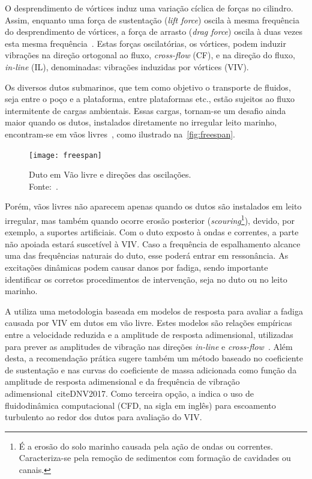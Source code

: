 O desprendimento de vórtices induz uma variação cíclica de forças no cilindro.
Assim, enquanto uma força de sustentação (\textit{lift force}) oscila à mesma frequência do desprendimento de vórtices, a força de arrasto (\textit{drag force}) oscila à duas vezes esta mesma frequência~\cite{Sumer1995}.
Estas forças oscilatórias, os vórtices, podem induzir vibrações na direção ortogonal ao fluxo, \textit{cross-flow} (CF), e na direção do fluxo, \textit{in-line} (IL), denominadas: vibrações induzidas por vórtices (VIV).

Os diversos dutos submarinos, que tem como objetivo o transporte de fluidos, seja entre o poço e a plataforma, entre plataformas etc., estão sujeitos ao fluxo intermitente de cargas ambientais.
Essas cargas, tornam-se um desafio ainda maior quando os dutos, instalados diretamente no irregular leito marinho, encontram-se em vãos livres~\cite{Fyrileiv1998}, como ilustrado na~\autoref{fig:freespan}.

\begin{figure}[!h]
\begin{center}
\texttt{[image: freespan]}
\caption[Duto em Vão livre e direções das oscilações]{Duto em Vão livre e direções das oscilações.\\Fonte:~\cite{DNV2017}.}\label{fig:freespan}
\end{center}
\end{figure}

Porém, vãos livres não aparecem apenas quando os dutos são instalados em leito irregular, mas também quando ocorre erosão posterior (\textit{scouring}\footnote{É a erosão do solo marinho causada pela ação de ondas ou correntes.
Caracteriza-se pela remoção de sedimentos com formação de cavidades ou canais.}), devido, por exemplo, a suportes artificiais.
Com o duto exposto à ondas e correntes, a parte não apoiada estará suscetível à VIV.
Caso a frequência de espalhamento alcance uma das frequências naturais do duto, esse poderá entrar em ressonância.
As excitações dinâmicas podem causar danos por fadiga, sendo importante identificar os corretos procedimentos de intervenção, seja no duto ou no leito marinho.

A  utiliza uma metodologia baseada em modelos de resposta para avaliar a fadiga causada por VIV em dutos em vão livre.
Estes modelos são relações empíricas entre a velocidade reduzida e a amplitude de resposta adimensional, utilizadas para prever as amplitudes de vibração nas direções \textit{in-line} e \textit{cross-flow}~\cite{Mork2003}. %
Além desta, a recomendação prática sugere também um método baseado no coeficiente de sustentação e nas curvas do coeficiente de massa adicionada como função da amplitude de resposta adimensional e da frequência de vibração adimensional~cite{DNV2017}.
Como terceira opção, a  indica o uso de fluidodinâmica computacional (CFD, na sigla em inglês) para escoamento turbulento ao redor dos dutos para avaliação do VIV.

